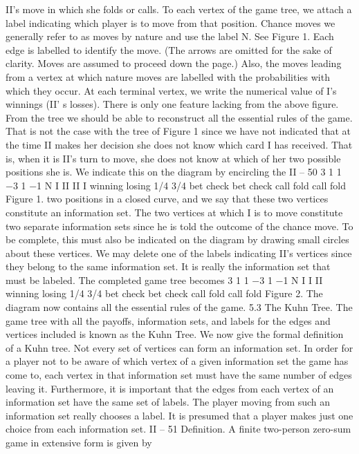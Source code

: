 II’s move in which she folds or calls. To each vertex of the game tree, we attach a label
indicating which player is to move from that position. Chance moves we generally refer to
as moves by nature and use the label N. See Figure 1.
Each edge is labelled to identify the move. (The arrows are omitted for the sake of
clarity. Moves are assumed to proceed down the page.) Also, the moves leading from a
vertex at which nature moves are labelled with the probabilities with which they occur.
At each terminal vertex, we write the numerical value of I’s winnings (II’ s losses).
There is only one feature lacking from the above figure. From the tree we should be
able to reconstruct all the essential rules of the game. That is not the case with the tree of
Figure 1 since we have not indicated that at the time II makes her decision she does not
know which card I has received. That is, when it is II’s turn to move, she does not know at
which of her two possible positions she is. We indicate this on the diagram by encircling the
II – 50
3 1
1
−3 1
−1
N
I
II II
I
winning losing
1/4 3/4
bet check bet check
call fold call fold
Figure 1.
two positions in a closed curve, and we say that these two vertices constitute an information
set. The two vertices at which I is to move constitute two separate information sets since
he is told the outcome of the chance move. To be complete, this must also be indicated
on the diagram by drawing small circles about these vertices. We may delete one of the
labels indicating II’s vertices since they belong to the same information set. It is really
the information set that must be labeled. The completed game tree becomes
3 1
1
−3 1
−1
N
I I
II
winning losing
1/4 3/4
bet check bet check
call fold call fold
Figure 2.
The diagram now contains all the essential rules of the game.
5.3 The Kuhn Tree. The game tree with all the payoffs, information sets, and labels
for the edges and vertices included is known as the Kuhn Tree. We now give the formal
definition of a Kuhn tree.
Not every set of vertices can form an information set. In order for a player not to
be aware of which vertex of a given information set the game has come to, each vertex in
that information set must have the same number of edges leaving it. Furthermore, it is
important that the edges from each vertex of an information set have the same set of labels.
The player moving from such an information set really chooses a label. It is presumed that
a player makes just one choice from each information set.
II – 51
Definition. A finite two-person zero-sum game in extensive form is given by
